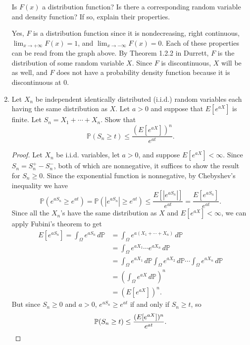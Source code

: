\documentclass[11pt,oneside,english]{amsart}
\theoremstyle{definition}
\newcommand{\lspace}{\vspace{5mm}}
\newcommand{\1}{\mathbbm{1}}
\newcommand{\p}{\mathbb{P}}
\begin{document}
\begin{enumerate}[leftmargin=*]
\begin{minipage}{0.5\textwidth}
\end{minipage}


Is $F(x)$ a distribution function? Is there a corresponding random variable and density function? If so, explain their properties.



\lspace
Yes, $F$ is a distribution function since it is nondecreasing, right continuous, $\lim_{x\to+\infty}F(x)=1$, and $\lim_{x\to-\infty}F(x)=0$. Each of these properties can be read from the graph above. By Theorem 1.2.2 in Durrett, $F$ is the distribution of some random variable $X$. Since $F$ is discontinuous, $X$ will be as well, and $F$ does not have a probability density function because it is discontinuous at 0.




\pagebreak




\item Let $X_n$ be independent identically distributed (i.i.d.) random variables each having the same distribution as $X$. Let $a>0$ and suppose that $E[e^{aX}]$ is finite. Let $S_n=X_1+\cdots+X_n$. Show that
\[
\p(S_n\geq t)\leq\frac{(E[e^{aX}])^n}{e^{at}}.
\]

\begin{proof}
Let $X_n$ be i.i.d. variables, let $a>0$, and suppose $E[e^{aX}]<\infty$. Since $S_n=S_n^+-S_n^-$, both of which are nonnegative, it suffices to show the result for $S_n\geq 0$. Since the exponential function is nonnegative, by Chebyshev's inequality we have
\[
\p\left(e^{aS_n}\geq e^{at}\right)=\p\left(\left|e^{aS_n}\right|\geq e^{at}\right)\leq\frac{E\left[\left|e^{aS_n}\right|\right]}{e^{at}}=\frac{E\left[e^{aS_n}\right]}{e^{at}}.
\]
Since all the $X_n$'s have the same distribution as $X$ and $E[e^{aX}]<\infty$, we can apply Fubini's theorem to get
\begin{align*}
E\left[e^{aS_n}\right]=\int_\Omega e^{aS_n}\,d\p&=\int_\Omega e^{a(X_1+\cdots+X_n)}\,d\p\\[2mm]
&=\int_\Omega e^{aX_1}\cdots e^{aX_n}\,d\p\\[2mm]
&=\int_\Omega e^{aX_1}\,d\p\int_\Omega e^{aX_2}\,d\p\cdots\int_\Omega e^{aX_n}\,d\p\\[2mm]
&=\left(\int_\Omega e^{aX}\,d\p\right)^n\\[2mm]
&=\left(E\left[e^{aX}\right]\right)^n.
\end{align*}
But since $S_n\geq 0$ and $a>0$, $e^{aS_n}\geq e^{at}$ if and only if $S_n\geq t$, so 
\[
\p(S_n\geq t)\leq\frac{(E[e^{aX}])^n}{e^{at}}.\qedhere
\]
\end{proof}







\end{enumerate}
\end{document}
